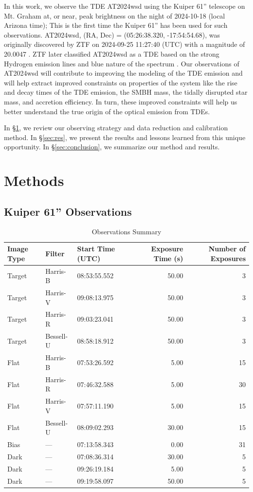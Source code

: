 \documentclass{aastex631}
\begin{document}
In this work, we observe the TDE AT2024wsd using the Kuiper 61'' telescope on Mt. Graham at, or near, peak brightness on the night of 2024-10-18 (local Arizona time); This is the first time the Kuiper 61'' has been used for such observations. AT2024wsd, (RA, Dec) = (05:26:38.320, -17:54:54.68), was originally discovered by ZTF on 2024-09-25 11:27:40 (UTC) with a magnitude of 20.0047 \citep{at2024wsd_discovery}. ZTF later classified AT2024wsd as a TDE based on the strong Hydrogen emission lines and blue nature of the spectrum \citep{at2024wsd_classification}. Our observations of AT2024wsd will contribute to improving the modeling of the TDE emission and will help extract improved constraints on properties of the system like the rise and decay times of the TDE emission, the SMBH mass, the tidally disrupted star mass, and accretion efficiency. In turn, these improved constraints will help us better understand the true origin of the optical emission from TDEs.

In \S\ref{sec:method}, we review our observing strategy and data reduction and calibration method. In \S\ref{sec:res}, we present the results and lessons learned from this unique opportunity. In \S\ref{sec:conclusion}, we summarize our method and results.

\section{Methods}\label{sec:method}
\subsection{Kuiper 61'' Observations}

\begin{table}
\caption{Observations Summary}
\label{tab:obs}
\begin{tabular}{lllrr}
\hline
Image Type & Filter & Start Time (UTC) & Exposure Time (s) & Number of Exposures \\
\hline
Target & Harris-B & 08:53:55.552 & 50.00 & 3 \\
Target & Harris-V & 09:08:13.975 & 50.00 & 3 \\
Target & Harris-R & 09:03:23.041 & 50.00 & 3 \\
Target & Bessell-U & 08:58:18.912 & 50.00 & 3 \\
Flat & Harris-B & 07:53:26.592 & 5.00 & 15 \\
Flat & Harris-R & 07:46:32.588 & 5.00 & 30 \\
Flat & Harris-V & 07:57:11.190 & 5.00 & 15 \\
Flat & Bessell-U & 08:09:02.293 & 30.00 & 15 \\
Bias & --- & 07:13:58.343 & 0.00 & 31 \\
Dark & --- & 07:08:36.314 & 30.00 & 5 \\
Dark & --- & 09:26:19.184 & 5.00 & 5 \\
Dark & --- & 09:19:58.097 & 50.00 & 5 \\
\hline
\end{tabular}
\end{table}
\end{document}
